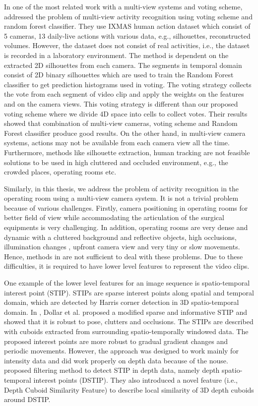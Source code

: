  	In one of the most related work with a multi-view systems and voting scheme, \citet{Zhu201320} addressed the problem of multi-view activity recognition using voting scheme and random forest classifier. They use IXMAS human action dataset \cite{IXMAS:weinland06, IXMAS:weinland10a} which consist of 5 cameras, 13 daily-live actions with various data, e.g., silhouettes, reconstructed volumes. However, the dataset does not consist of real activities, i.e., the dataset is recorded in a laboratory environment. The method is dependent on the extracted 2D silhouettes from each camera. The segments in temporal domain consist of 2D binary silhouettes which are used to train the Random Forest classifier to get prediction histograms used in voting. The voting strategy collects the vote from each segment of video clip and apply the weights on the features and on the camera views. This voting strategy is different than our proposed voting scheme where we divide 4D space into cells to collect votes. Their results showed that combination of multi-view cameras, voting scheme and Random Forest classifier produce good results. On the other hand, in multi-view camera systems, actions may not be available from each camera view all the time. Furthermore, methods like silhouette extraction, human tracking are not feasible solutions to be used in high cluttered and occluded environment, e.g., the crowded places, operating rooms etc.
    
    Similarly, in this thesis, we address the problem of activity recognition in the operating room using a multi-view camera system. It is not a trivial problem because of various challenges. Firstly, camera positioning in operating rooms for better field of view while accommodating the articulation of the surgical equipments is very challenging. In addition, operating rooms are very dense and dynamic with a cluttered background and reflective objects, high occlusions, illumination changes , upfront camera view and very tiny or slow movements. Hence, methods in \cite{6909503, 6909476, 6909731,6909735, Zhu201320} are not sufficient to deal with these problems. Due to these difficulties, it is required to have lower level features to represent the video clips.
    
    One example of the lower level features for an image sequence is spatio-temporal interest point (STIP)\cite{ laptev2005space}. STIPs are sparse interest points along spatial and temporal domain, which are detected by Harris corner detection in 3D spatio-temporal domain. In \cite{1570899}, Dollar et al. proposed a modified sparse and informative STIP and showed that it is robust to pose, clutters and occlusions. The STIPs \cite{1570899} are described with cuboids extracted from surrounding spatio-temporally windowed data. The proposed interest points are more robust to gradual gradient changes and periodic movements. However, the approach was designed to work mainly for intensity data and did work properly on depth data because of the nouse. \citet{6619209} proposed filtering method to detect STIP in depth data, namely depth spatio-temporal interest points (DSTIP). They also introduced a novel feature (i.e., Depth Cuboid Similarity Feature) to describe local similarity of 3D depth cuboids around DSTIP.
    
